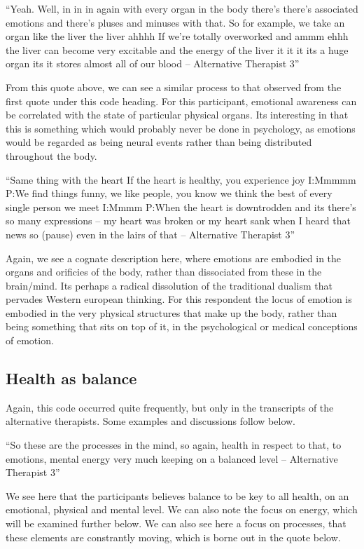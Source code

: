 ``Yeah. Well, in in in again with every organ in the body there's there's associated emotions and there's pluses and minuses with that. So for example, we take an organ like the liver the liver ahhhh If we're totally overworked and ammm ehhh the liver can become very excitable and the energy of the liver it it it its a huge organ its it stores almost all of our blood – Alternative Therapist 3''

From this quote above, we can see a similar process to that observed from the first quote under this code heading. For this participant, emotional awareness can be correlated with the state of particular physical organs. Its interesting in that this is something which would probably never be done in psychology, as emotions would be regarded as being neural events rather than being distributed throughout the body. 

``Same thing with the heart If the heart is healthy, you experience joy 
I:Mmmmm
P:We find things funny, we like people, you know we think the best of every single person we meet 
I:Mmmm
P:When the heart is downtrodden and its there's so many expressions – my heart was broken or my heart sank when I heard that news so (pause) even in the lairs of that – Alternative Therapist 3''

Again, we see a cognate description here, where emotions are embodied in the organs and orificies of the body, rather than dissociated from these in the brain/mind. Its perhaps a radical dissolution of the traditional dualism that pervades Western european thinking. For this respondent the locus of emotion is embodied in the very physical structures that make up the body, rather than being something that sits on top of it, in the psychological or medical conceptions of emotion. 

\subsection{Health as balance}

Again, this code occurred quite frequently, but only in the transcripts of the alternative therapists. Some examples and discussions follow below. 

``So these are the processes in the mind, so again, health in respect to that, to emotions, mental energy very much keeping on a balanced level – Alternative Therapist 3''

We see here that the participants believes balance to be key to all health, on an emotional, physical and mental level. We can also note the focus on energy, which will be examined further below. We can also see here a focus on processes, that these elements are constrantly moving, which is borne out in the quote below. 

